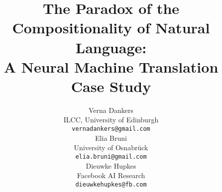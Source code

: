\documentclass[11pt,a4paper]{article}
\title{The Paradox of the Compositionality of Natural Language: \\A Neural Machine Translation Case Study}
\author{Verna Dankers \\
  ILCC, University of Edinburgh \\
  \texttt{\small vernadankers@gmail.com} \\\And
  Elia Bruni \\
  University of Osnabr\"uck \\
  \texttt{\small elia.bruni@gmail.com} \\\And
  Dieuwke Hupkes \\
  Facebook AI Research \\
  \texttt{\small dieuwkehupkes@fb.com}}
\begin{document}
\maketitle

























\clearpage

\appendix
\begin{appendices}


\end{appendices}
\end{document}
